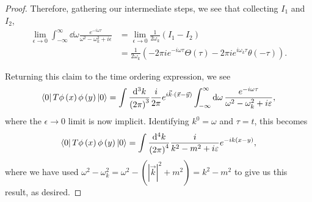 \begin{proof}
    Therefore, gathering our intermediate steps, we see that collecting $I_1$ and $I_2$, 
    \begin{align}
        \lim_{\epsilon \to 0} \int_{-\infty}^{\infty} \dd{\omega} \frac{e^{-i \omega \tau}}{\omega^2 - \omega_k^2 + i\epsilon} &= \lim_{\epsilon \to 0} \frac{1}{2 \omega_k} \left( I_1 - I_2 \right)  \\
        &= \frac{1}{2\omega_k} \left( -2\pi i e^{-i \omega \tau} \Theta \left( \tau \right) - 2 \pi i e^{i \omega_k \tau}\theta \left( -\tau \right)  \right)
    .\end{align}

    Returning this claim to the time ordering expression, we see
    \begin{align}
        \bra{0} T \phi \left( x \right) \phi \left( y \right) \ket{0} = \int \frac{\dd{^3k}}{\left( 2\pi \right)^3} \frac{i}{2\pi}  e^{i \vec{k} \cdot \left( \vec{x} - \vec{y} \right) } \int_{-\infty}^{\infty} \dd{\omega} \frac{e^{-i \omega \tau}}{\omega^2 - \omega_k^2 + i \varepsilon}
    ,\end{align}
    where the $\epsilon \to 0$ limit is now implicit. Identifying $k^{0} = \omega$ and $\tau = t$, this becomes
    \begin{align}
        \bra{0} T \phi \left( x \right) \phi \left( y \right) \ket{0} = \int \frac{\dd{^4k}}{\left( 2\pi \right)^4} \frac{i}{k^2 - m^2 + i \varepsilon} e^{-i k \left( x - y \right) }
    ,\end{align}
    where we have used $\omega^2 - \omega_k^2 = \omega^2 - \left( \left| \vec{k} \right|^2 + m^2  \right) = k^2 - m^2 $ to give us this result, as desired.
\end{proof}


